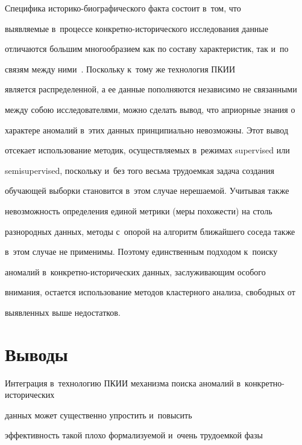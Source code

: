 

  


                            


  Специфика историко-био\-гра\-фи\-че\-ско\-го факта состоит в~том, что 


выявляемые в~процессе конкретно-исторического исследования данные 


отличаются большим многообразием как по составу характеристик, так и~по 


связям между ними~\cite{5-ada}. Поскольку к~тому же технология ПКИИ 


является распределенной, а ее данные пополняются независимо не связанными 


между собою исследователями, можно сделать вывод, что априорные знания о 


характере аномалий в~этих данных принципиально невозможны. Этот вывод 


отсекает использование методик, осуществляемых в~режимах supervised или 


semisupervised, поскольку и~без того весьма трудоемкая задача создания 


обучающей выборки становится в~этом случае нерешаемой. Учитывая также 


невозможность определения единой метрики (меры похожести) на столь 


разнородных данных, методы с~опорой на алгоритм ближайшего соседа также 


в~этом случае не применимы. Поэтому единственным подходом к~поиску 


аномалий в~кон\-крет\-но-ис\-то\-ри\-че\-ских данных, заслуживающим особого 


внимания, остается использование методов кластерного анализа, свободных от 


выявленных выше недостатков.


  


\section{Выводы}


  


  Интеграция в~технологию ПКИИ механизма поиска аномалий в~кон\-крет\-но-ис\-то\-ри\-че\-ских 


  данных может существенно упростить и~повысить 


эффективность такой плохо формализуемой и~очень трудоемкой фазы  



